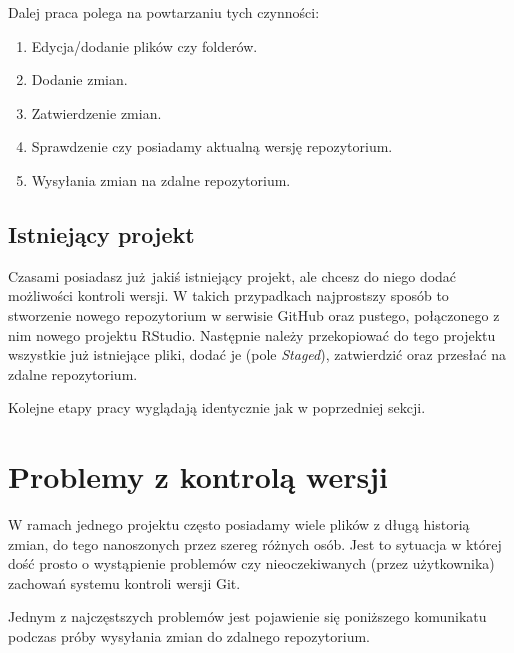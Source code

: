 \documentclass[paper=6in:9in,pagesize=pdftex,headinclude=on,footinclude=on,10pt]{scrbook}
\providecommand{\tightlist}{%
  \setlength{\itemsep}{0pt}\setlength{\parskip}{0pt}}
\begin{document}
Dalej praca polega na powtarzaniu tych czynności:

\begin{enumerate}
\def\labelenumi{\arabic{enumi}.}
\tightlist
\item
  Edycja/dodanie plików czy folderów.
\item
  Dodanie zmian.
\item
  Zatwierdzenie zmian.
\item
  Sprawdzenie czy posiadamy aktualną wersję repozytorium.
\item
  Wysyłania zmian na zdalne repozytorium.
\end{enumerate}

\hypertarget{istniejacy-projekt}{%
\subsection{Istniejący projekt}\label{istniejacy-projekt}}

Czasami posiadasz już~jakiś istniejący projekt, ale chcesz do niego dodać możliwości kontroli wersji.
W takich przypadkach najprostszy sposób to stworzenie nowego repozytorium w serwisie GitHub oraz pustego, połączonego z nim nowego projektu RStudio.
Następnie należy przekopiować do tego projektu wszystkie już istniejące pliki, dodać je (pole \emph{Staged}), zatwierdzić oraz przesłać na zdalne repozytorium.

Kolejne etapy pracy wyglądają identycznie jak w poprzedniej sekcji.

\hypertarget{problemy-z-kontrolux105-wersji}{%
\section{Problemy z kontrolą wersji}\label{problemy-z-kontrolux105-wersji}}

W ramach jednego projektu często posiadamy wiele plików z długą historią zmian, do tego nanoszonych przez szereg różnych osób.
Jest to sytuacja w której dość prosto o wystąpienie problemów czy nieoczekiwanych (przez użytkownika) zachowań systemu kontroli wersji Git.

Jednym z najczęstszych problemów jest pojawienie się poniższego komunikatu podczas próby wysyłania zmian do zdalnego repozytorium.
\end{document}
